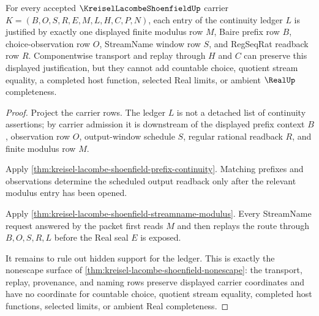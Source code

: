 \begin{theorem}\label{thm:kreisel-lacombe-shoenfield-modulus-ledger-exactness}
For every accepted $\KreiselLacombeShoenfieldUp$ carrier $K=(B,O,S,R,E,M,L,H,C,P,N)$, each entry of the continuity ledger $L$ is justified by exactly one displayed finite modulus row $M$, Baire prefix row $B$, choice-observation row $O$, StreamName window row $S$, and RegSeqRat readback row $R$. Componentwise transport and replay through $H$ and $C$ can preserve this displayed justification, but they cannot add countable choice, quotient stream equality, a completed host function, selected Real limits, or ambient $\RealUp$ completeness.
\end{theorem}
\begin{proof}
Project the carrier rows. The ledger $L$ is not a detached list of continuity assertions; by carrier admission it is downstream of the displayed prefix context $B$, observation row $O$, output-window schedule $S$, regular rational readback $R$, and finite modulus row $M$.

Apply \autoref{thm:kreisel-lacombe-shoenfield-prefix-continuity}. Matching prefixes and observations determine the scheduled output readback only after the relevant modulus entry has been opened.

Apply \autoref{thm:kreisel-lacombe-shoenfield-streamname-modulus}. Every StreamName request answered by the packet first reads $M$ and then replays the route through $B,O,S,R,L$ before the Real seal $E$ is exposed.

It remains to rule out hidden support for the ledger. This is exactly the nonescape surface of \autoref{thm:kreisel-lacombe-shoenfield-nonescape}: the transport, replay, provenance, and naming rows preserve displayed carrier coordinates and have no coordinate for countable choice, quotient stream equality, completed host functions, selected limits, or ambient Real completeness.
\end{proof}

